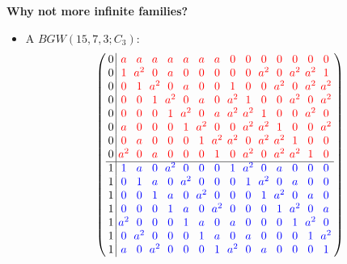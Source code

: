 \documentclass{beamer}
\newcommand{\RR}[1]{\textcolor{red}{#1}}
\newcommand{\BB}[1]{\textcolor{blue}{#1}}
\begin{document}
\begin{frame}

  \begin{center}
    {\Large\bf Why not more infinite families?}
  \end{center}

\end{frame}

\begin{frame}

  \begin{itemize}
  \item A $BGW(15,7,3; C_3)$:
    \[
      \left(
        \arraycolsep=2.0pt\def\arraystretch{1.0}
        \begin{array}{c|cccccccccccccc}
          0&\RR{a}&\RR{a}&\RR{a}&\RR{a}&\RR{a}&\RR{a}&\RR{a}&\RR{0}&\RR{0}&\RR{0}&\RR{0}&\RR{0}&\RR{0}&\RR{0}\\
          0&\RR{1}&\RR{a^2}&\RR{0}&\RR{a}&\RR{0}&\RR{0}&\RR{0}&\RR{0}&\RR{0}&\RR{a^2}&\RR{0}&\RR{a^2}&\RR{a^2}&\RR{1}\\
          0&\RR{0}&\RR{1}&\RR{a^2}&\RR{0}&\RR{a}&\RR{0}&\RR{0}&\RR{1}&\RR{0}&\RR{0}&\RR{a^2}&\RR{0}&\RR{a^2}&\RR{a^2}\\
          0&\RR{0}&\RR{0}&\RR{1}&\RR{a^2}&\RR{0}&\RR{a}&\RR{0}&\RR{a^2}&\RR{1}&\RR{0}&\RR{0}&\RR{a^2}&\RR{0}&\RR{a^2}\\
          0&\RR{0}&\RR{0}&\RR{0}&\RR{1}&\RR{a^2}&\RR{0}&\RR{a}&\RR{a^2}&\RR{a^2}&\RR{1}&\RR{0}&\RR{0}&\RR{a^2}&\RR{0}\\
          0&\RR{a}&\RR{0}&\RR{0}&\RR{0}&\RR{1}&\RR{a^2}&\RR{0}&\RR{0}&\RR{a^2}&\RR{a^2}&\RR{1}&\RR{0}&\RR{0}&\RR{a^2}\\
          0&\RR{0}&\RR{a}&\RR{0}&\RR{0}&\RR{0}&\RR{1}&\RR{a^2}&\RR{a^2}&\RR{0}&\RR{a^2}&\RR{a^2}&\RR{1}&\RR{0}&\RR{0}\\
          0&\RR{a^2}&\RR{0}&\RR{a}&\RR{0}&\RR{0}&\RR{0}&\RR{1}&\RR{0}&\RR{a^2}&\RR{0}&\RR{a^2}&\RR{a^2}&\RR{1}&\RR{0}\\ \hline
          1&\BB{1}&\BB{a}&\BB{0}&\BB{a^2}&\BB{0}&\BB{0}&\BB{0}&\BB{1}&\BB{a^2}&\BB{0}&\BB{a}&\BB{0}&\BB{0}&\BB{0}\\
          1&\BB{0}&\BB{1}&\BB{a}&\BB{0}&\BB{a^2}&\BB{0}&\BB{0}&\BB{0}&\BB{1}&\BB{a^2}&\BB{0}&\BB{a}&\BB{0}&\BB{0}\\
          1&\BB{0}&\BB{0}&\BB{1}&\BB{a}&\BB{0}&\BB{a^2}&\BB{0}&\BB{0}&\BB{0}&\BB{1}&\BB{a^2}&\BB{0}&\BB{a}&\BB{0}\\
          1&\BB{0}&\BB{0}&\BB{0}&\BB{1}&\BB{a}&\BB{0}&\BB{a^2}&\BB{0}&\BB{0}&\BB{0}&\BB{1}&\BB{a^2}&\BB{0}&\BB{a}\\
          1&\BB{a^2}&\BB{0}&\BB{0}&\BB{0}&\BB{1}&\BB{a}&\BB{0}&\BB{a}&\BB{0}&\BB{0}&\BB{0}&\BB{1}&\BB{a^2}&\BB{0}\\
          1&\BB{0}&\BB{a^2}&\BB{0}&\BB{0}&\BB{0}&\BB{1}&\BB{a}&\BB{0}&\BB{a}&\BB{0}&\BB{0}&\BB{0}&\BB{1}&\BB{a^2}\\
          1&\BB{a}&\BB{0}&\BB{a^2}&\BB{0}&\BB{0}&\BB{0}&\BB{1}&\BB{a^2}&\BB{0}&\BB{a}&\BB{0}&\BB{0}&\BB{0}&\BB{1}\\
        \end{array}
      \right)
    \]
  \end{itemize}


\end{frame}
\end{document}
